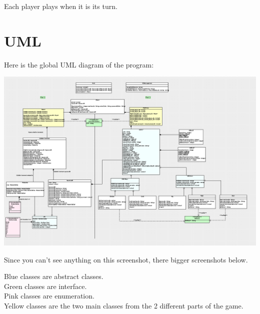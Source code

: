 Each player plays when it is its turn.

\section{UML}

Here is the global UML diagram of the program:

\includegraphics[width=450pt]{../../Images/UMLdiagramme.png}

Since you can't see anything on this screenshot, there bigger screenshots below.

Blue classes are abstract classes.\\
Green classes are interface.\\
Pink classes are enumeration.\\
Yellow classes are the two main classes from the 2 different parts of the game.\\

